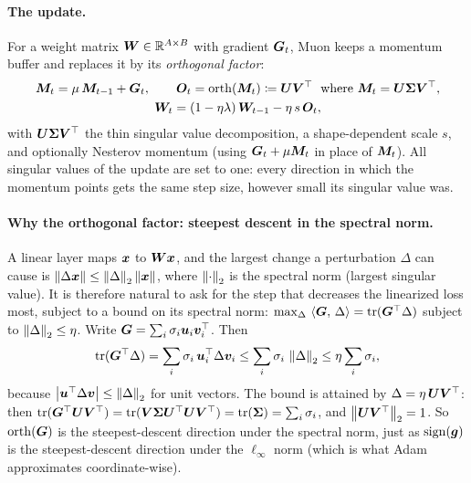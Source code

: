 \paragraph{The update.} For a weight matrix $\bm{W} \in \mathbb{R}^{A\times B}$ with gradient $\bm{G}_t$,
Muon keeps a momentum buffer and replaces it by its \emph{orthogonal factor}:
\begin{equation}\label{eq:c01-muon}
\begin{gathered}
  \bm{M}_t = \mu\,\bm{M}_{t-1} + \bm{G}_t,\qquad
  \bm{O}_t = \mathrm{orth}(\bm{M}_t) \coloneqq \bm{U}\bm{V}^{\top} \;\text{ where } \bm{M}_t = \bm{U}\bm{\Sigma}\bm{V}^{\top},\\
  \bm{W}_t = (1-\eta\lambda)\,\bm{W}_{t-1} - \eta\,s\,\bm{O}_t ,
\end{gathered}
\end{equation}
with $\bm{U}\bm{\Sigma}\bm{V}^{\top}$ the thin singular value decomposition, a shape-dependent scale $s$, and
optionally Nesterov momentum (using $\bm{G}_t + \mu\bm{M}_t$ in place of $\bm{M}_t$). All singular
values of the update are set to one: every direction in which the momentum points gets the
same step size, however small its singular value was.

\paragraph{Why the orthogonal factor: steepest descent in the spectral norm.} A linear layer
maps $\bm{x}$ to $\bm{W}\bm{x}$, and the largest change a perturbation $\Delta$ can cause is
$\left\lVert \Delta\bm{x}\right\rVert \le \left\lVert \Delta\right\rVert_2\left\lVert \bm{x}\right\rVert$, where $\left\lVert \cdot\right\rVert_2$ is the spectral
norm (largest singular value). It is therefore natural to ask for the step that decreases
the linearized loss most, subject to a bound on its spectral norm:
$\max_{\Delta}\,\left\langle \bm{G},\, \Delta\right\rangle = \operatorname{tr}(\bm{G}^{\top}\Delta)$ subject to $\left\lVert \Delta\right\rVert_2 \le \eta$.
Write $\bm{G} = \sum_i \sigma_i\bm{u}_i\bm{v}_i^{\top}$. Then
\[
  \operatorname{tr}(\bm{G}^{\top}\Delta) = \sum_i \sigma_i\,\bm{u}_i^{\top}\Delta\bm{v}_i
  \le \sum_i\sigma_i\,\left\lVert \Delta\right\rVert_2 \le \eta\sum_i\sigma_i ,
\]
because $\left\lvert \bm{u}^{\top}\Delta\bm{v}\right\rvert \le \left\lVert \Delta\right\rVert_2$ for unit vectors. The bound is attained by
$\Delta = \eta\,\bm{U}\bm{V}^{\top}$: then $\operatorname{tr}(\bm{G}^{\top}\bm{U}\bm{V}^{\top}) = \operatorname{tr}(\bm{V}\bm{\Sigma}\bm{U}^{\top}\bm{U}\bm{V}^{\top}) =
\operatorname{tr}(\bm{\Sigma}) = \sum_i\sigma_i$, and $\left\lVert \bm{U}\bm{V}^{\top}\right\rVert_2 = 1$. So $\mathrm{orth}(\bm{G})$ is the
steepest-descent direction under the spectral norm, just as $\mathrm{sign}(\bm{g})$ is the
steepest-descent direction under the $\ell_\infty$ norm (which is what Adam approximates
coordinate-wise).

